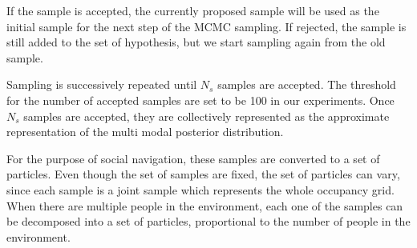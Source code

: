 If the sample is accepted, the currently proposed sample will be used as the initial sample for the next step of the MCMC sampling. If rejected, the sample is still added to the set of hypothesis, but we start sampling again from the old sample.


Sampling is successively repeated until $N_{s}$ samples are accepted. The threshold for the number of accepted samples are set to be 100 in our experiments. Once $N_{s}$ samples are accepted, they are collectively represented as the approximate representation of the multi modal posterior distribution. 

For the purpose of social navigation, these samples are converted to a set of particles. Even though the set of samples are fixed, the set of particles can vary, since each sample is a joint sample which represents the whole occupancy grid. When there are multiple people in the environment, each one of the samples can be decomposed into a set of particles, proportional to the number of people in the environment. %